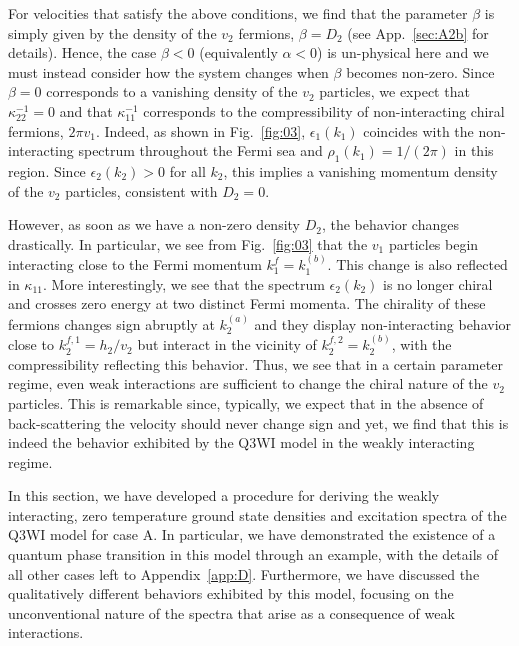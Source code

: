 \documentclass[aps,pra,
superscriptaddress,
reprint,twocolumn,preprintnumbers,
amsmath,amssymb,
nofootinbib]{revtex4-1}
\begin{document}
For velocities that satisfy the above conditions, we find that the parameter $\beta$ is simply given by the density of the $v_2$ fermions, $\beta = D_2$ (see App.~\ref{sec:A2b} for details). Hence, the case $\beta<0$ (equivalently $\alpha < 0$) is un-physical here and we must instead consider how the system changes when $\beta$ becomes non-zero. Since $\beta = 0$ corresponds to a vanishing density of the $v_2$ particles, we expect that $\kappa_{22}^{-1} = 0$ and that $\kappa_{11}^{-1}$ corresponds to the compressibility of non-interacting chiral fermions, $2 \pi v_1$. Indeed, as shown in Fig.~\ref{fig:03}, $\epsilon_1(k_1)$ coincides with the non-interacting spectrum throughout the Fermi sea and $\rho_1(k_1) = 1/(2\pi)$ in this region. Since $\epsilon_2(k_2) > 0$ for all $k_2$, this implies a vanishing momentum density of the $v_2$ particles, consistent with $D_2 = 0$.

However, as soon as we have a non-zero density $D_2$, the behavior changes drastically. In particular, we see from Fig.~\ref{fig:03} that the $v_1$ particles begin interacting close to the Fermi momentum $k_1^f = k_1^{(b)}$. This change is also reflected in $\kappa_{11}$. More interestingly, we see that the spectrum $\epsilon_2(k_2)$ is no longer chiral and crosses zero energy at two distinct Fermi momenta. The chirality of these fermions changes sign abruptly at $k_2^{(a)}$ and they display non-interacting behavior close to $k_2^{f,1} = h_2/v_2$ but interact in the vicinity of $k_2^{f,2} = k_2^{(b)}$, with the compressibility reflecting this behavior. Thus, we see that in a certain parameter regime, even weak interactions are sufficient to change the chiral nature of the $v_2$ particles. This is remarkable since, typically, we expect that in the absence of back-scattering the velocity should never change sign and yet, we find that this is indeed the behavior exhibited by the Q3WI model in the weakly interacting regime. 

In this section, we have developed a procedure for deriving the weakly interacting, zero temperature ground state densities and excitation spectra of the Q3WI model for case A. In particular, we have demonstrated the existence of a quantum phase transition in this model through an example, with the details of all other cases left to Appendix~\ref{app:D}. Furthermore, we have discussed the qualitatively different behaviors exhibited by this model, focusing on the unconventional nature of the spectra that arise as a consequence of weak interactions. 
      
\end{document}
